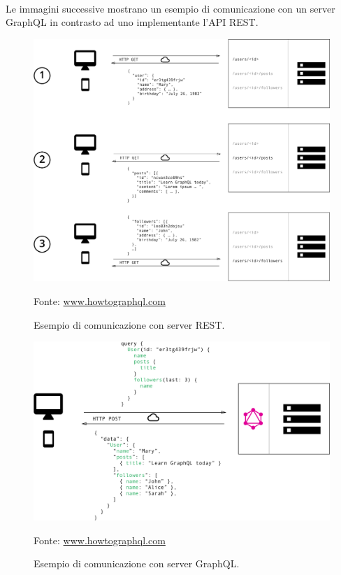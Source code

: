 \documentclass[a4paper, 12pt]{report}
\newcommand{\source}[1]{\caption*{Fonte: {#1}}}
\begin{document}
      \paragraph*{}
        Le immagini successive mostrano un esempio di comunicazione con un server GraphQL in contrasto ad uno implementante l'API REST.
        \begin{figure}[H]
          \includegraphics[width=\textwidth]{rest-communication.png}
          \caption{Esempio di comunicazione con server REST.}
          \source{\href{https://www.howtoGraphQL.com/basics/1-GraphQL-is-the-better-rest/}{www.howtographql.com}}
        \end{figure}
        \begin{figure}[H]
          \includegraphics[width=\textwidth]{graphql-communication.png}
          \caption{Esempio di comunicazione con server GraphQL.}
          \source{\href{https://www.howtoGraphQL.com/basics/1-GraphQL-is-the-better-rest/}{www.howtographql.com}}
        \end{figure}
\end{document}
